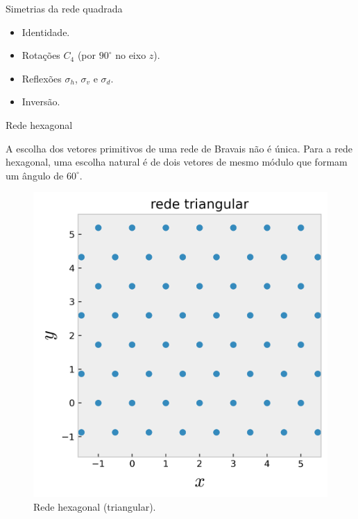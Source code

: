 \documentclass[aspectratio=169]{beamer}
\begin{document}


\begin{frame}{Simetrias da rede quadrada}

\begin{itemize}
\item Identidade.
\n\n
\item Rotações $C_4$ (por $90^\circ$ no eixo $z$).
\n\n
\item Reflexões $\sigma_h$, $\sigma_v$ e $\sigma_d$.
\n\n
\item Inversão.
\end{itemize}

\end{frame}




\begin{frame}{Rede hexagonal}

A escolha dos vetores primitivos de uma rede de Bravais não é única. Para a rede hexagonal, uma escolha natural é de dois vetores de mesmo módulo que formam um ângulo de $60^\circ$.

\begin{figure}[H]
\centering
\includegraphics[width=0.35\linewidth]{fig/lattice_triang.png}
\caption{Rede hexagonal (triangular).}
\label{fig:lat-triang}
\end{figure}

\end{frame}


\end{document}
